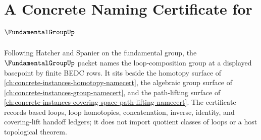 \chapter{A Concrete Naming Certificate for $\FundamentalGroupUp$}
\label{ch:concrete-instances-fundamental-group-namecert}

Following Hatcher and Spanier on the fundamental group, the $\FundamentalGroupUp$ packet names the loop-composition group at a displayed basepoint by finite BEDC rows. It sits beside the homotopy surface of \autoref{ch:concrete-instances-homotopy-namecert}, the algebraic group surface of \autoref{ch:concrete-instances-group-namecert}, and the path-lifting surface of \autoref{ch:concrete-instances-covering-space-path-lifting-namecert}. The certificate records based loops, loop homotopies, concatenation, inverse, identity, and covering-lift handoff ledgers; it does not import quotient classes of loops or a host topological theorem.

